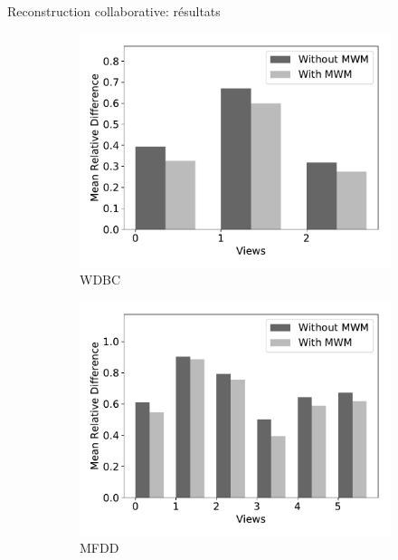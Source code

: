\documentclass[hyperref={pdfpagelabels=false}]{beamer}
\begin{document}
    \begin{frame}{Reconstruction collaborative: résultats}
        \begin{figure}[!h]
            \centering
            \begin{subfigure}[c]{0.45\textwidth}
                \includegraphics[scale=.26]{mrd_wdbc}
                \caption{WDBC}
            \end{subfigure}
            \begin{subfigure}[c]{0.45\textwidth}
                \includegraphics[scale=.26]{mrd_mfeat}
                \caption{MFDD}
            \end{subfigure}\\
            \begin{subfigure}[c]{0.45\textwidth}

\end{subfigure}
\end{figure}
\end{frame}
\end{document}
